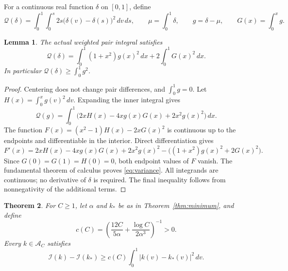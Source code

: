\documentclass[11pt]{article}
\newtheorem{theorem}{Theorem}[section]
\newtheorem{lemma}[theorem]{Lemma}
\newcommand{\I}{\mathcal I}
\begin{document}
For a continuous real function $\delta$ on $[0,1]$, define
\[
 \mathcal Q(\delta)=\int_0^1\int_0^s
       2s\bigl(\delta(v)-\delta(s)\bigr)^2\,dv\,ds,
 \qquad \mu=\int_0^1\delta,
 \qquad g=\delta-\mu,
 \qquad G(x)=\int_0^xg.
\]
\begin{lemma}\label{lem:variance}
The actual weighted pair integral satisfies
\begin{equation}\label{eq:variance}
 \mathcal Q(\delta)=\int_0^1(1+x^2)g(x)^2\,dx
                       +2\int_0^1G(x)^2\,dx.
\end{equation}
In particular $\mathcal Q(\delta)\geq\int_0^1g^2$.
\end{lemma}
\begin{proof}
Centering does not change pair differences, and $\int_0^1g=0$.
Let $H(x)=\int_0^xg(v)^2\,dv$. Expanding the inner integral gives
\[
 \mathcal Q(g)=\int_0^1
    \bigl(2xH(x)-4xg(x)G(x)+2x^2g(x)^2\bigr)\,dx.
\]
The function $F(x)=(x^2-1)H(x)-2xG(x)^2$ is continuous up to the
endpoints and differentiable in the interior. Direct differentiation gives
\[
 F'(x)=2xH(x)-4xg(x)G(x)+2x^2g(x)^2
                   -\bigl((1+x^2)g(x)^2+2G(x)^2\bigr).
\]
Since $G(0)=G(1)=H(0)=0$, both endpoint values of $F$ vanish.
The fundamental theorem of calculus proves \eqref{eq:variance}. All
integrands are continuous; no derivative of $\delta$ is required.
The final inequality follows from nonnegativity of the additional terms.
\end{proof}

\begin{theorem}\label{thm:stability}
For $C\geq1$, let $\alpha$ and $k_*$ be as in Theorem~\ref{thm:minimum},
and define
\begin{equation}\label{eq:stabilityconstant}
 c(C)=\left(\frac{12C}{5\alpha}
                +\frac{\log C}{2\alpha^3}\right)^{-1}>0.
\end{equation}
Every $k\in\mathcal A_C$ satisfies
\begin{equation}\label{eq:stability}
 \I(k)-\I(k_*)\geq c(C)\int_0^1|k(v)-k_*(v)|^2\,dv.
\end{equation}
\end{theorem}
\end{document}
